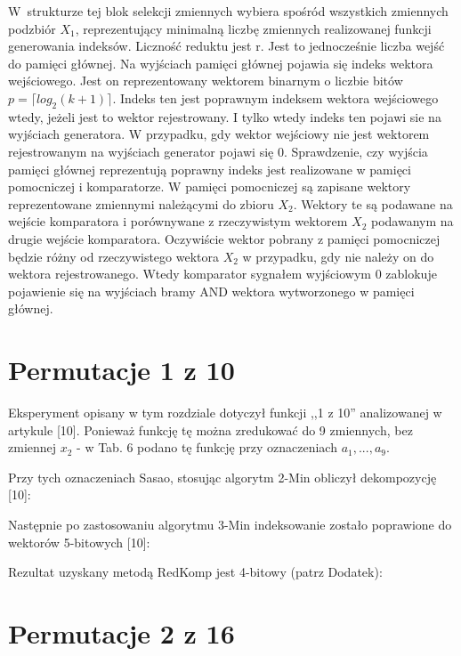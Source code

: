 W~strukturze tej blok selekcji zmiennych wybiera spośród wszystkich zmiennych podzbiór $X_1$,
reprezentujący minimalną liczbę zmiennych realizowanej funkcji generowania indeksów.
Liczność reduktu jest r.
Jest to jednocześnie liczba wejść do pamięci głównej.
Na wyjściach pamięci głównej pojawia się indeks wektora wejściowego. %
Jest on reprezentowany wektorem binarnym o liczbie bitów $p = \lceil log_2 (k+1)\rceil$.
Indeks ten jest poprawnym indeksem wektora wejściowego wtedy,
jeżeli jest to wektor rejestrowany.
I tylko wtedy indeks ten pojawi sie na wyjściach generatora.
W przypadku,
gdy wektor wejściowy nie jest wektorem rejestrowanym na wyjściach generator pojawi się 0.
Sprawdzenie,
czy wyjścia pamięci głównej reprezentują poprawny indeks jest realizowane w pamięci pomocniczej i komparatorze.
W pamięci pomocniczej są zapisane wektory reprezentowane zmiennymi należącymi do zbioru $X_2$.
Wektory te są podawane na wejście komparatora i porównywane z rzeczywistym wektorem $X_2$ podawanym na drugie wejście komparatora.
Oczywiście wektor pobrany z pamięci pomocniczej będzie różny od rzeczywistego wektora $X_2$ w przypadku,
gdy nie należy on do wektora rejestrowanego.
Wtedy komparator sygnałem wyjściowym 0 zablokuje pojawienie się na wyjściach bramy AND wektora wytworzonego w pamięci głównej.

\section{Permutacje 1 z 10}

Eksperyment opisany w tym rozdziale dotyczył funkcji ,,1 z 10'' analizowanej w artykule [10].
Ponieważ funkcję tę można zredukować do 9 zmiennych,
bez zmiennej $x_2$ - w Tab. 6 podano tę funkcję przy oznaczeniach $a_1, ..., a_9$.

Przy tych oznaczeniach Sasao, stosując algorytm 2-Min obliczył dekompozycję [10]:

Następnie po zastosowaniu algorytmu 3-Min indeksowanie zostało poprawione do wektorów 5-bitowych [10]:

Rezultat uzyskany metodą RedKomp jest 4-bitowy (patrz Dodatek):

\section{Permutacje 2 z 16}

